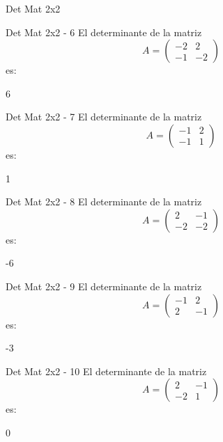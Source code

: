\documentclass[a4,11pt]{aleph-notas}
\begin{document}
\begin{quiz}{Det Mat 2x2}
\begin{numerical}[tolerance=0]%
    {Det Mat 2x2 - 6}
    El determinante de la matriz
    \[
        A = \begin{pmatrix} -2 & 2 \\ -1 & -2 \end{pmatrix}
    \]
    es:
    \item[] 6
\end{numerical}

\begin{numerical}[tolerance=0]%
    {Det Mat 2x2 - 7}
    El determinante de la matriz
    \[
        A = \begin{pmatrix} -1 & 2 \\ -1 & 1 \end{pmatrix}
    \]
    es:
    \item[] 1
\end{numerical}

\begin{numerical}[tolerance=0]%
    {Det Mat 2x2 - 8}
    El determinante de la matriz
    \[
        A = \begin{pmatrix} 2 & -1 \\ -2 & -2 \end{pmatrix}
    \]
    es:
    \item[] -6
\end{numerical}

\begin{numerical}[tolerance=0]%
    {Det Mat 2x2 - 9}
    El determinante de la matriz
    \[
        A = \begin{pmatrix} -1 & 2 \\ 2 & -1 \end{pmatrix}
    \]
    es:
    \item[] -3
\end{numerical}

\begin{numerical}[tolerance=0]%
    {Det Mat 2x2 - 10}
    El determinante de la matriz
    \[
        A = \begin{pmatrix} 2 & -1 \\ -2 & 1 \end{pmatrix}
    \]
    es:
    \item[] 0
\end{numerical}


\end{quiz}
\end{document}
